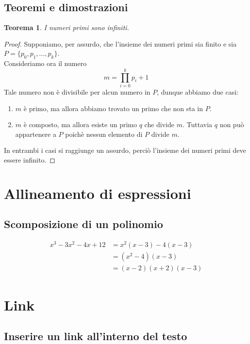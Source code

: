 \documentclass[a4paper,11pt]{article}
\begin{document}
    \subsection*{Teoremi e dimostrazioni}
    \newtheorem{teo}{Teorema}
    \begin{teo}
        I numeri primi sono infiniti.
    \end{teo}
    \begin{proof}
        Supponiamo, per assurdo, che l'insieme dei numeri primi sia finito e sia $P=\{p_0, p_1, ...  , p_k\}$.\\
        Consideriamo ora il numero
        \[
            m = \prod_{i=0}^k p_i +1
        \]
        Tale numero non è divisibile per alcun numero in $P$, dunque abbiamo due casi:
        \begin{enumerate}
            \item $m$ è primo, ma allora abbiamo trovato un primo che non sta in $P$.
            \item $m$ è composto, ma allora esiste un primo $q$ che divide $m$. Tuttavia $q$ non può appartenere a $P$ poichè nessun elemento di $P$ divide $m$.
        \end{enumerate}
        In entrambi i casi si raggiunge un assurdo, perciò l'insieme dei numeri primi deve essere infinito.
    \end{proof}

    \section{Allineamento di espressioni}
    \subsection*{Scomposizione di un polinomio}
    \begin{align*}
    x^3-3x^2-4x+12 &= x^2(x-3)-4(x-3)       \\
                   &= (x^2-4)(x-3)          \\
                   &= (x-2)(x+2)(x-3)       \\
    \end{align*}

    \section{Link}
    \subsection*{Inserire un link all'interno del testo}
\end{document}
